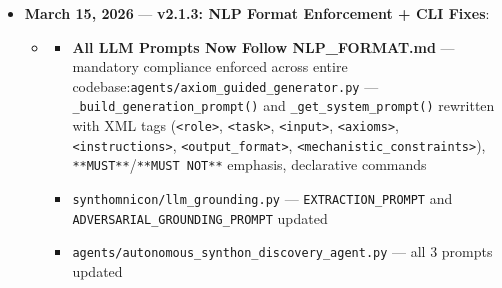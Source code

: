 \documentclass[12pt,a4paper]{article}
\begin{document}
\begin{itemize}
\begin{itemize}
    \item 
    \begin{itemize}
    \item \textbf{Demo script} (\texttt{examples/demo\_protocols.py}):Exercises all four protocols with calibrated reference values
    \item \texttt{carboxylic\_acid\_dimer} $\Delta$G = -12.0 kJ/mol $\rightarrow$ \xi\_CP $\approx$ 6.66 nats {[}HIGH{]}
    \item \texttt{proline\_aldol\_cycle} three-step D\_$\infty$ validation with reset detection
    \item Three-component ensemble: molecular + temporal + mechanical
    \item Retrodesign with catalog lookup and notation string decomposition
\end{itemize}

    \item \texttt{\_\_init\_\_.py} version bumped to \texttt{0.3.0}; all four modules exported in \texttt{\_\_all\_\_}
\end{itemize}

    \item 
    \textbf{March 15, 2026} --- \textbf{v2.1.3: NLP Format Enforcement + CLI Fixes}:

    \begin{itemize}
    \item 
    \begin{itemize}
    \item \textbf{All LLM Prompts Now Follow NLP\_FORMAT.md} --- mandatory compliance enforced across entire codebase:\texttt{agents/axiom\_guided\_generator.py} --- \texttt{\_build\_generation\_prompt()} and \texttt{\_get\_system\_prompt()} rewritten with XML tags (\texttt{\textless{}role\textgreater{}}, \texttt{\textless{}task\textgreater{}}, \texttt{\textless{}input\textgreater{}}, \texttt{\textless{}axioms\textgreater{}}, \texttt{\textless{}instructions\textgreater{}}, \texttt{\textless{}output\_format\textgreater{}}, \texttt{\textless{}mechanistic\_constraints\textgreater{}}), \texttt{**MUST**}/\texttt{**MUST NOT**} emphasis, declarative commands
    \item \texttt{synthomnicon/llm\_grounding.py} --- \texttt{EXTRACTION\_PROMPT} and \texttt{ADVERSARIAL\_GROUNDING\_PROMPT} updated
    \item \texttt{agents/autonomous\_synthon\_discovery\_agent.py} --- all 3 prompts updated
\end{itemize}


\end{itemize}
\end{itemize}
\end{document}
